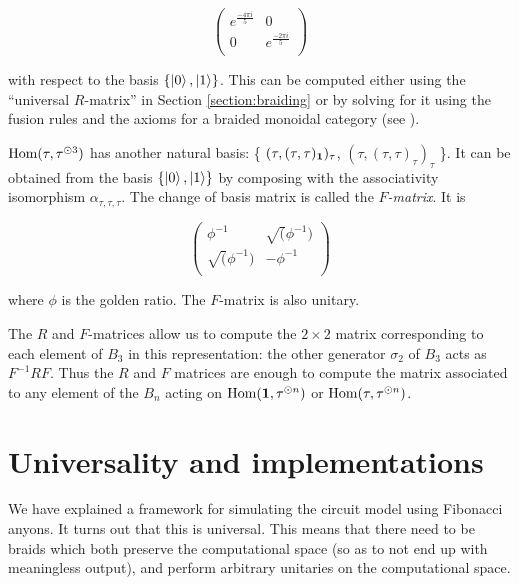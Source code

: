 \begin{equation}
\begin{pmatrix}
e^{\frac{-4\pi i}{5}} & 0 \\
0 & e^{\frac{-2\pi i}{5}}  \\
\end{pmatrix}
\end{equation}

with respect to the basis $\left\{ \left|0\right>, \left|1\right> \right\}$. This can be
computed either using the ``universal $R$-matrix'' in Section \ref{section:braiding} or
by solving for it using the fusion rules and the axioms for a braided monoidal
category (see \cite{Panangaden}).

$\operatorname{Hom}(\tau, \tau^{\odot 3})$ has another natural basis: \{ $(\tau,
(\tau,\tau)_{\mathbf{1}})_\tau$, $(\tau, (\tau,\tau)_\tau)_\tau$ \}. It can be obtained
from the basis $\left\{ \left|0\right>, \left|1\right> \right\}$ by composing with the
associativity isomorphism $\alpha_{\tau,\tau,\tau}$. The change of basis matrix
is called the \emph{$F$-matrix}. It is

\begin{equation}
\begin{pmatrix}
\phi^{-1} & \sqrt(\phi^{-1}) \\
\sqrt(\phi^{-1}) & -\phi^{-1} \\
\end{pmatrix}
\end{equation}

where $\phi$ is the golden ratio. The $F$-matrix is also unitary.

The $R$ and $F$-matrices allow us to compute the $2 \times 2$ matrix
corresponding to each element of $B_3$ in this representation: the other
generator $\sigma_2$ of $B_3$ acts as $F^{-1}RF$. Thus the $R$ and $F$
matrices are enough to compute the matrix associated to any element of the
$B_n$ acting on $\operatorname{Hom}(\mathbf{1}, \tau^{\odot n})$ or $\operatorname{Hom}(\tau, \tau^{\odot n})$.


\section{Universality and implementations}

We have explained a framework for simulating the circuit model using
Fibonacci anyons. It turns out that this is universal. This means
that there need to be braids which both preserve the computational space (so as
to not end up with meaningless output), and perform arbitrary unitaries on the
computational space.

